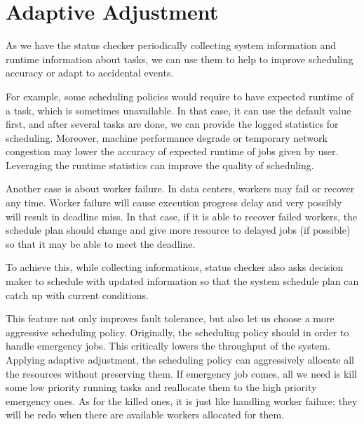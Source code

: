 \section{Adaptive Adjustment}\label{sec:adaptive}

As we have the status checker periodically collecting system information
and runtime information about tasks, we can use them to help to improve
scheduling accuracy or adapt to accidental events.

For example, some scheduling policies would require to have expected
runtime of a task, which is sometimes unavailable.
In that case, it can use the default value first, and after several
tasks are done, we can provide the logged statistics for scheduling.
Moreover, machine performance degrade or temporary network congestion
may lower the accuracy of expected runtime of jobs given by user.
Leveraging the runtime statistics can improve the quality of
scheduling.

Another case is about worker failure.
In data centers, workers may fail or recover any time.
Worker failure will cause execution progress delay and very possibly
will result in deadline miss.
In that case, if it is able to recover failed workers, the schedule plan
should change and give more resource to delayed jobs (if possible) so
that it may be able to meet the deadline.

To achieve this, while collecting informations, status checker also
asks decision maker to schedule with updated information so that the
system schedule plan can catch up with current conditions.

This feature not only improves fault tolerance, but also let us choose a
more aggressive scheduling policy.
Originally, the scheduling policy should in order to handle emergency
jobs.
This critically lowers the throughput of the system.
Applying adaptive adjustment, the scheduling policy can aggressively
allocate all the resources without preserving them.
If emergency job comes, all we need is kill some low priority running
tasks and reallocate them to the high priority emergency ones.
As for the killed ones, it is just like handling worker failure; they
will be redo when there are available workers allocated for them.

